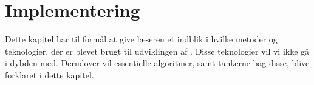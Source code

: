 \chapter{Implementering}
\label{chap:implementering}
Dette kapitel har til formål at give læseren et indblik i hvilke metoder og teknologier, der er blevet brugt til udviklingen af \Foodl. Disse teknologier vil vi ikke gå i dybden med. Derudover vil essentielle algoritmer, samt tankerne bag disse, blive forklaret i dette kapitel.


